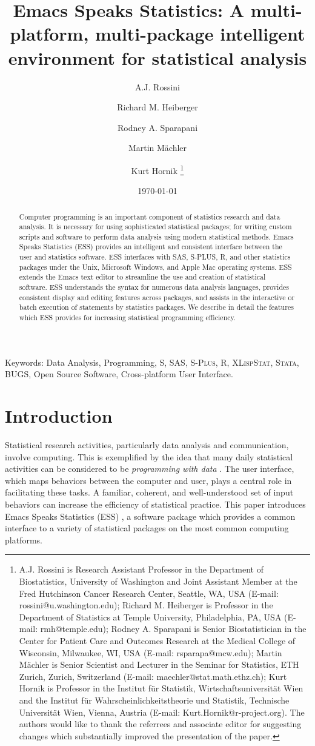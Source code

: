 \documentclass{article}
\title{Emacs Speaks Statistics: A multi-platform, multi-package
intelligent environment for statistical analysis}
\author{A.J. Rossini \and Richard M. Heiberger \and Rodney A. Sparapani
\and Martin M{\"a}chler \and Kurt Hornik \footnote{%
    A.J. Rossini is Research Assistant Professor in the Department of
    Biostatistics, University of Washington and Joint Assistant Member at
    the Fred Hutchinson Cancer Research Center, Seattle, WA, USA
    (E-mail: rossini@u.washington.edu);
    Richard M. Heiberger is Professor in the Department of Statistics at
    Temple University, Philadelphia, PA, USA (E-mail: rmh@temple.edu);
    Rodney A. Sparapani is Senior Biostatistician in the Center for Patient
    Care and Outcomes Research at the Medical College of Wisconsin,
    Milwaukee, WI, USA (E-mail: rsparapa@mcw.edu);
    Martin M{\"a}chler is Senior Scientist and Lecturer in the Seminar for
    Statistics, ETH Zurich, Zurich, Switzerland
    (E-mail: maechler@stat.math.ethz.ch);
    Kurt Hornik is Professor in the Institut f{\"u}r Statistik,
    Wirtschaftsuniversit{\"a}t Wien and the Institut f{\"u}r
    Wahrscheinlichkeitstheorie und Statistik, Technische
    Universit{\"a}t Wien, Vienna, Austria (E-mail:
    Kurt.Hornik@r-project.org).  The authors would like to thank the
    referrees and associate editor for suggesting changes which
    substantially improved the presentation of the paper.}}
\date{\today}
\newif\ifdraft
\renewcommand{\baselinestretch}{1.5}
\newcommand*{\SAS}{\textsc{SAS}}
\newcommand*{\Splus}{\textsc{S-Plus}}
\newcommand*{\XLispStat}{\textsc{XLispStat}}
\newcommand*{\Stata}{\textsc{Stata}}
\begin{document}

\ifdraft
\setcounter{page}{0}
\tableofcontents
\fi

\maketitle

\ifdraft{}%
\else%
 \renewcommand{\baselinestretch}{1.5}
\fi

\begin{abstract}
  Computer programming is an important component of statistics
  research and data analysis.  It is necessary for using
  sophisticated statistical packages; for writing custom scripts
  and software to perform data analysis using modern statistical
  methods.  Emacs Speaks Statistics (ESS) provides an intelligent and
  consistent interface between the user and statistics software.  ESS
  interfaces with SAS, S-PLUS, R, and other statistics packages under
  the Unix, Microsoft Windows, and Apple Mac operating systems.  ESS
  extends the Emacs text editor to streamline the use and creation of
  statistical software.  ESS understands the syntax for numerous data
  analysis languages, provides consistent display and editing
  features across packages, and assists in the interactive or batch
  execution of statements by statistics packages.
  We describe in detail the features which ESS provides for increasing
  statistical programming efficiency.
\end{abstract}

\noindent Keywords: Data Analysis, Programming,
S, \SAS, \Splus, R, \XLispStat, \Stata, BUGS, Open Source Software,
Cross-platform User Interface.

\section{Introduction}
\label{sec:introduction}

Statistical research activities, particularly data analysis and
communication, involve computing.  This is exemplified by the idea
that many daily statistical activities can be considered to be
\textit{programming with data} \citep{ChaJ98}.  The user interface,
which maps behaviors between the computer and user, plays a central
role in facilitating these tasks.
A familiar, coherent, and well-understood
set of input behaviors can increase the efficiency of statistical
practice.  This paper introduces Emacs Speaks Statistics (ESS)
\citep{ESS}, a software package which provides a common interface to a
variety of statistical packages on the most common computing
platforms.
\end{document}

